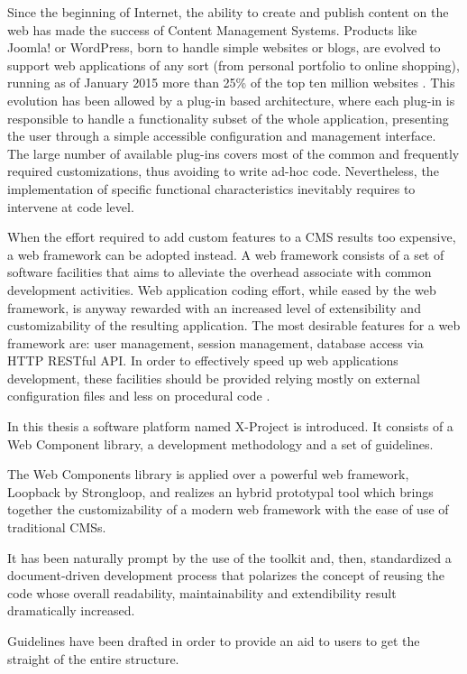 Since the beginning of Internet, the ability to create and publish content on the web has made the success of Content Management Systems. Products like Joomla! or WordPress, born to handle simple websites or blogs, are evolved to support web applications of any sort (from personal portfolio to online shopping), running as of January 2015 more than 25\% of the top ten million websites \cite{cms_stats}. This evolution has been allowed by a plug-in based architecture, where each plug-in is responsible to handle a functionality subset of the whole application, presenting the user through a simple accessible configuration and management interface.
The large number of available plug-ins covers most of the common and frequently required customizations, thus avoiding to write ad-hoc code. Nevertheless, the implementation of specific functional characteristics inevitably requires to intervene at code level.

When the effort required to add custom features to a CMS results too expensive, a web framework can be adopted instead. A web framework consists of a set of software facilities that aims to alleviate the overhead associate with common development activities. Web application coding effort, while eased by the web framework, is anyway rewarded with an increased level of extensibility and customizability of the resulting application.
The most desirable features for a web framework are: user management, session management, database access via HTTP RESTful API. In order to effectively speed up web applications development, these facilities should be provided relying mostly on external configuration files and less on procedural code \cite{MIPRO}.

In this thesis a software platform named X-Project is introduced. It consists of a Web Component library, a development methodology and a set of guidelines.

The Web Components library is applied over a powerful web framework, Loopback by Strongloop, and realizes an hybrid prototypal tool which brings together the customizability of a modern web framework with the ease of use of traditional CMSs.

It has been naturally prompt by the use of the toolkit and, then, standardized a document-driven development process that polarizes the concept of reusing the code whose overall readability, maintainability and extendibility result dramatically increased.

Guidelines have been drafted in order to provide an aid to users to get the straight of the entire structure.


